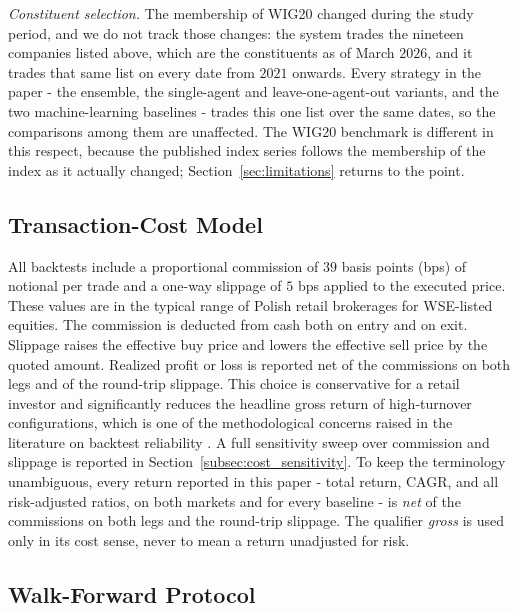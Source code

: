 \documentclass{ieeeaccess}
\begin{document}
\emph{Constituent selection.} The membership of WIG20 changed during the study period, and we do not track those changes: the system trades the nineteen companies listed above, which are the constituents as of March $2026$, and it trades that same list on every date from $2021$ onwards. Every strategy in the paper - the ensemble, the single-agent and leave-one-agent-out variants, and the two machine-learning baselines - trades this one list over the same dates, so the comparisons among them are unaffected. The WIG20 benchmark is different in this respect, because the published index series follows the membership of the index as it actually changed; Section~\ref{sec:limitations} returns to the point.

\subsection{Transaction-Cost Model}
\label{subsec:costs}

All backtests include a proportional commission of $39$ basis points (bps) of notional per trade and a one-way slippage of $5$ bps applied to the executed price. These values are in the typical range of Polish retail brokerages for WSE-listed equities. The commission is deducted from cash both on entry and on exit. Slippage raises the effective buy price and lowers the effective sell price by the quoted amount. Realized profit or loss is reported net of the commissions on both legs and of the round-trip slippage. This choice is conservative for a retail investor and significantly reduces the headline gross return of high-turnover configurations, which is one of the methodological concerns raised in the literature on backtest reliability \cite{bailey2014}. A full sensitivity sweep over commission and slippage is reported in Section~\ref{subsec:cost_sensitivity}. To keep the terminology unambiguous, every return reported in this paper - total return, CAGR, and all risk-adjusted ratios, on both markets and for every baseline - is \emph{net} of the commissions on both legs and the round-trip slippage. The qualifier \emph{gross} is used only in its cost sense, never to mean a return unadjusted for risk.

\subsection{Walk-Forward Protocol}
\label{subsec:walkforward}
\end{document}
